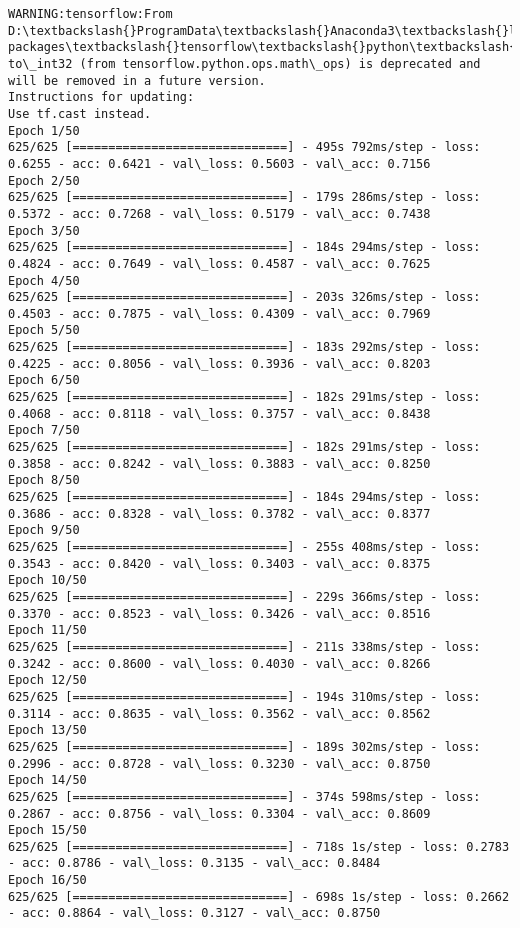 \documentclass[11pt]{article}
\begin{document}
    \begin{Verbatim}[commandchars=\\\{\}]
WARNING:tensorflow:From D:\textbackslash{}ProgramData\textbackslash{}Anaconda3\textbackslash{}lib\textbackslash{}site-packages\textbackslash{}tensorflow\textbackslash{}python\textbackslash{}ops\textbackslash{}math\_ops.py:3066: to\_int32 (from tensorflow.python.ops.math\_ops) is deprecated and will be removed in a future version.
Instructions for updating:
Use tf.cast instead.
Epoch 1/50
625/625 [==============================] - 495s 792ms/step - loss: 0.6255 - acc: 0.6421 - val\_loss: 0.5603 - val\_acc: 0.7156
Epoch 2/50
625/625 [==============================] - 179s 286ms/step - loss: 0.5372 - acc: 0.7268 - val\_loss: 0.5179 - val\_acc: 0.7438
Epoch 3/50
625/625 [==============================] - 184s 294ms/step - loss: 0.4824 - acc: 0.7649 - val\_loss: 0.4587 - val\_acc: 0.7625
Epoch 4/50
625/625 [==============================] - 203s 326ms/step - loss: 0.4503 - acc: 0.7875 - val\_loss: 0.4309 - val\_acc: 0.7969
Epoch 5/50
625/625 [==============================] - 183s 292ms/step - loss: 0.4225 - acc: 0.8056 - val\_loss: 0.3936 - val\_acc: 0.8203
Epoch 6/50
625/625 [==============================] - 182s 291ms/step - loss: 0.4068 - acc: 0.8118 - val\_loss: 0.3757 - val\_acc: 0.8438
Epoch 7/50
625/625 [==============================] - 182s 291ms/step - loss: 0.3858 - acc: 0.8242 - val\_loss: 0.3883 - val\_acc: 0.8250
Epoch 8/50
625/625 [==============================] - 184s 294ms/step - loss: 0.3686 - acc: 0.8328 - val\_loss: 0.3782 - val\_acc: 0.8377
Epoch 9/50
625/625 [==============================] - 255s 408ms/step - loss: 0.3543 - acc: 0.8420 - val\_loss: 0.3403 - val\_acc: 0.8375
Epoch 10/50
625/625 [==============================] - 229s 366ms/step - loss: 0.3370 - acc: 0.8523 - val\_loss: 0.3426 - val\_acc: 0.8516
Epoch 11/50
625/625 [==============================] - 211s 338ms/step - loss: 0.3242 - acc: 0.8600 - val\_loss: 0.4030 - val\_acc: 0.8266
Epoch 12/50
625/625 [==============================] - 194s 310ms/step - loss: 0.3114 - acc: 0.8635 - val\_loss: 0.3562 - val\_acc: 0.8562
Epoch 13/50
625/625 [==============================] - 189s 302ms/step - loss: 0.2996 - acc: 0.8728 - val\_loss: 0.3230 - val\_acc: 0.8750
Epoch 14/50
625/625 [==============================] - 374s 598ms/step - loss: 0.2867 - acc: 0.8756 - val\_loss: 0.3304 - val\_acc: 0.8609
Epoch 15/50
625/625 [==============================] - 718s 1s/step - loss: 0.2783 - acc: 0.8786 - val\_loss: 0.3135 - val\_acc: 0.8484
Epoch 16/50
625/625 [==============================] - 698s 1s/step - loss: 0.2662 - acc: 0.8864 - val\_loss: 0.3127 - val\_acc: 0.8750

\end{Verbatim}
\end{document}
